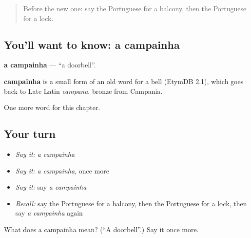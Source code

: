 \label{lesson:PT-C157-campainha}



\begin{quote}
Before the new one: say the Portuguese for a balcony, then the Portuguese for a lock.
\end{quote}

\subsection*{You'll want to know: a campainha}
\textbf{a campainha} — \textquotedblleft{}a doorbell\textquotedblright{}.

\begin{cousinweb}
\textbf{campainha} is a small form of an old word for a bell (EtymDB 2.1), which goes back to Late Latin \emph{campana}, bronze from Campania.
\end{cousinweb}

\begin{grammarlens}[title={What you've built}]
One more word for this chapter.
\end{grammarlens}

\subsection*{Your turn}
\begin{itemize}
\raggedright
  \item \emph{Say it:} \emph{a campainha}
  \item \emph{Say it:} \emph{a campainha}, once more
  \item \emph{Say it:} say \emph{a campainha}
  \item \emph{Recall:} say the Portuguese for a balcony, then the Portuguese for a lock, then say \emph{a campainha} again
\end{itemize}

\begin{tcolorbox}[breakable,colback=teal!4,colframe=teal!35!black,title={Before you move on}]
What does a campainha mean? (\textquotedblleft{}A doorbell\textquotedblright{}.) Say it once more.
\end{tcolorbox}
